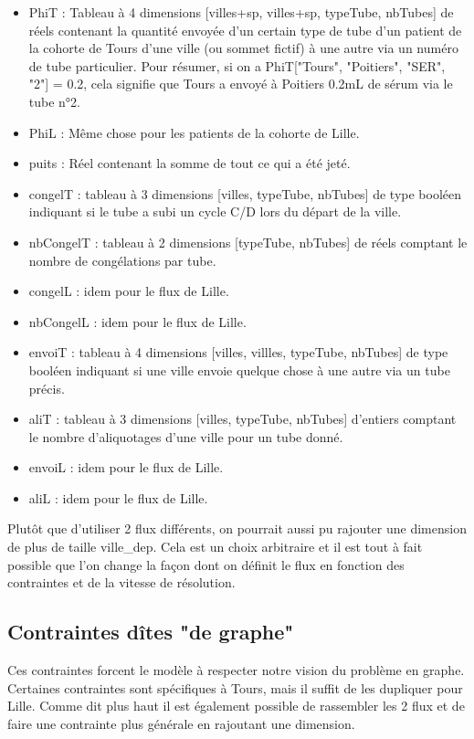 \documentclass{polytech/polytech}
\numberwithin{figure}{chapter}
\begin{document}
\begin{itemize}
	\item PhiT : Tableau à 4 dimensions [villes+sp, villes+sp, typeTube, nbTubes] de réels contenant la quantité envoyée d'un certain type de tube d'un patient de la cohorte de Tours d'une ville (ou sommet fictif) à une autre via un numéro de tube particulier.
Pour résumer, si on a PhiT["Tours", "Poitiers", "SER", "2"] = 0.2, cela signifie que Tours a envoyé à Poitiers 0.2mL de sérum via le tube n°2.
	\item PhiL : Même chose pour les patients de la cohorte de Lille.
	\item puits : Réel contenant la somme de tout ce qui a été jeté.
	\item congelT : tableau à 3 dimensions [villes, typeTube, nbTubes] de type booléen indiquant si le tube a subi un cycle C/D lors du départ de la ville.
	\item nbCongelT : tableau à 2 dimensions [typeTube, nbTubes] de réels comptant le nombre de congélations par tube.
	\item congelL : idem pour le flux de Lille.
	\item nbCongelL : idem pour le flux de Lille.
	\item envoiT : tableau à 4 dimensions [villes, villles, typeTube, nbTubes] de type booléen indiquant si une ville envoie quelque chose à une autre via un tube précis.
	\item aliT : tableau à 3 dimensions [villes, typeTube, nbTubes] d'entiers comptant le nombre d'aliquotages d'une ville pour un tube donné.
	\item envoiL : idem pour le flux de Lille.
	\item aliL : idem pour le flux de Lille.\\
\end{itemize}

Plutôt que d'utiliser 2 flux différents, on pourrait aussi pu rajouter une dimension de plus de taille ville\_dep. Cela est un choix arbitraire et il est tout à fait possible que l'on change la façon dont on définit le flux en fonction des contraintes et de la vitesse de résolution.
\pagebreak
\subsection{Contraintes dîtes "de graphe"}

Ces contraintes forcent le modèle à respecter notre vision du problème en graphe. Certaines contraintes sont spécifiques à Tours, mais il suffit de les dupliquer pour Lille. Comme dit plus haut il est également possible de rassembler les 2 flux et de faire une contrainte plus générale en rajoutant une dimension.
\end{document}
